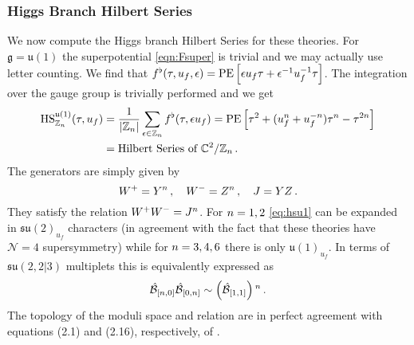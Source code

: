 \documentclass[main.tex]{subfiles}
\begin{document}
\subsubsection{Higgs Branch Hilbert Series}
We now compute the Higgs branch Hilbert Series for these theories. For $\mathfrak{g}=\mathfrak{u}(1)$ the superpotential \eqref{eqn:Fsuper} is trivial and we may actually use letter counting. We find that $f^{\flat}(\tau,u_f,\epsilon)=\operatorname{\mathrm{PE}}\left[\epsilon u_f\tau+\epsilon^{-1}u_f^{-1}\tau\right]$. The integration over the gauge group is trivially performed and we get
\begin{equation}
\begin{aligned}
\label{eq:hsu1}
\textrm{HS}^{\mathfrak{u}(1)}_{\mathbb{Z}_{n}}(\tau,u_f) &= \frac{1}{|\mathbb{Z}_{n}|}\sum_{\epsilon \in \mathbb{Z}_{n}}f^{\flat}(\tau,\epsilon u_f)=\operatorname{\mathrm{PE}}\left[\tau^2+(u_f^{n}+u_f^{-n})\tau^{n}-\tau^{2{n}}\right]\\
&=\text{Hilbert Series of $\mathbb{C}^2/\mathbb{Z}_{n}$}\, .
\end{aligned}
\end{equation}
The generators are simply given by 
\begin{equation}
W^+=Y^{n}\,,\quad W^-=Z^{n}\,,\quad J=YZ\,.
\end{equation} 
They satisfy the relation $W^+W^-=J^{n}$. For $n=1,2$ \eqref{eq:hsu1} can be expanded in $\mathfrak{su}(2)_{u_f}$ characters (in agreement with the fact that these theories have $\mathcal{N}=4$ supersymmetry) while for $n=3,4,6$ there is only $\mathfrak{u}(1)_{u_f}$. In terms of $\mathfrak{su}(2,2|3)$ multiplets this is equivalently expressed as
\begin{equation}\label{eqn:su223relation}
\hat{\mathcal{B}}_{[{n},0]}\hat{\mathcal{B}}_{[0,{n}]}\color{black}\sim\left(\hat{\mathcal{B}}_{[1,1]}\color{black}\right)^{n}\,.
\end{equation}
The topology of the moduli space and relation are in perfect agreement with equations (2.1) and (2.16), respectively, of \cite{Nishinaka:2016hbw,Lemos:2016xke}.
\end{document}
